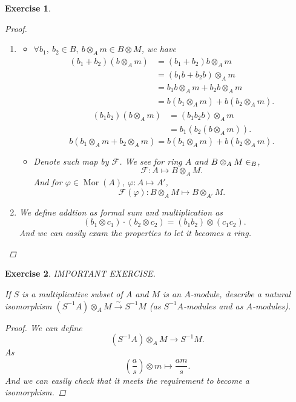 \documentclass{article}
\theoremstyle{breakstyle}
\newtheorem{exercise}{Exercise}[section]
\DeclareMathOperator{\mor}{Mor}
\let\mod\relax
\DeclareMathOperator{\mod}{Mod}
\begin{document}
\begin{exercise}
\begin{proof}
	\begin{enumerate}
		\item 
			\begin{itemize}
				\item $\forall b_{1},\ b_{2}\in B,\ b\otimes_{A}m\in B\otimes M$, we have
					\begin{align*}
                        (b_{1}+b_{2})(b\otimes_{A}m)
                        &=(b_{1}+b_{2})b\otimes_{A}m\\
                        &=(b_{1}b+b_{2}b)\otimes_{A}m\\
                        &=b_{1}b\otimes_{A}m+b_{2}b\otimes_{A}m\\
                        &=b(b_{1}\otimes_{A}m)+b(b_{2}\otimes_{A}m)
					.\end{align*}
					\begin{align*}
                        (b_{1}b_{2})(b\otimes_{A}m)
                        &=(b_{1}b_{2}b)\otimes_{A}m\\
                        &=b_{1}(b_{2}(b\otimes_{A}m))
					.\end{align*}
                    $$
                        b(b_{1}\otimes_{A}m+b_{2}\otimes_{A}m)
                        =b(b_{1}\otimes_{A}m)+b(b_{2}\otimes_{A}m)
					.$$
				\item Denote such map by $\mathcal{F}$. We see for ring $A$ and
                    $B\otimes_{A}M\in \mod_{B}$,
					$$
					 \mathcal{F}: A\longmapsto B\otimes_{A}M
					.$$ 
					And for $\varphi \in \mor(A),\ \varphi: A\mapsto A'$,
					$$
					\mathcal{F}(\varphi):B\otimes_{A}M\longmapsto B\otimes_{A'}M
					.$$ 
			\end{itemize}
		\item We define addtion as formal sum and multiplication as
			$$
			(b_1\otimes c_1)\cdot (b_2\otimes c_2)=(b_1b_2)\otimes (c_1c_2)
			.$$ 
			And we can easily exam the properties to let it becomes a ring.
	\end{enumerate}
\end{proof}

\end{exercise}

\begin{exercise}
IMPORTANT EXERCISE.

If $S$ is a multiplicative subset of $A$ and $M$ is an $A$-module, describe
a natural isomorphism $(S^{-1}A) \otimes_A M \stackrel{\sim}{\longrightarrow}
S^{-1}M$ (as $S^{-1}A$-modules and as $A$-modules).

\begin{proof}
	We can define
	$$
	(S^{-1}A)\otimes _{A}M\longrightarrow S^{-1}M
	.$$ 
	As
	$$
	(\frac{a}{s})\otimes m\longmapsto \frac{am}{s}
	.$$ 
    And we can easily check that it meets the requirement to become a
    isomorphism.
\end{proof}

\end{exercise}
\end{document}
